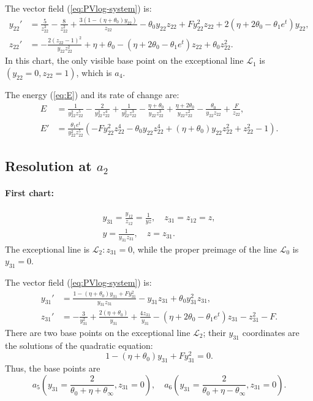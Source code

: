 The vector field (\ref{eq:PVlog-system}) is:
$$
\begin{aligned}
y_{22}'&=
\frac{5}{z_{22}^3} - \frac{8}{z_{22}^2} + \frac{3(1-( \eta+\theta_0) y_{22})}{z_{22}} 
- \theta_0 y_{22} z_{22} + F y_{22}^2 z_{22}+2 (\eta +2 \theta_0-\theta_1 e^t) y_{22} 
,
\\
z_{22}'&=
-\frac{2 ( z_{22}-1)^2}{y_{22} z_{22}^2}+
\eta + \theta_0  - (\eta+ 2 \theta_0-\theta_1 e^t) z_{22} + \theta_0 z_{22}^2
.
\end{aligned}
$$
In this chart, the only visible base point on the exceptional line $\mathcal{L}_1$ is $(y_{22}=0,z_{22}=1)$, which is $a_4$.

The energy (\ref{eq:E}) and its rate of change are:
$$
\begin{aligned}
E&=
\frac{1}{y_{22}^2 z_{22}^5}-\frac{2}{y_{22}^2 z_{22}^4}+\frac{1}{y_{22}^2 z_{22}^3}
-\frac{\eta+\theta_0}{y_{22} z_{22}^3}+\frac{\eta+2 \theta_0}{y_{22} z_{22}^2}-\frac{\theta_0}{y_{22} z_{22}}+\frac{F}{z_{22}}
,
\\
E'&=
\frac{\theta_1 e^t}{y_{22}^2 z_{22}^5}
\left(
-F y_{22}^2 z_{22}^4-\theta_0 y_{22} z_{22}^4+(\eta +\theta_0) y_{22} z_{22}^2+z_{22}^2-1
\right)
. 
\end{aligned}
$$


\subsection{Resolution at $a_2$}\label{a2-blow}
\paragraph{First chart:}
\begin{gather*}
y_{31}=\frac{y_{12}}{z_{12}}=\frac{1}{yz},
\quad
z_{31}=z_{12}=z,
\\
y=\frac{1}{y_{31}z_{31}},
\quad
z=z_{31}.
\end{gather*}
The exceptional line is $\mathcal{L}_2 : z_{31}=0$, while the proper preimage of the line $\mathcal{L}_{0}$ is $y_{31}=0$. 

The vector field (\ref{eq:PVlog-system}) is:
$$
\begin{aligned}
y_{31}'&=\frac{1 - (\eta + \theta_0) y_{31} + F y_{31}^2}{y_{31} z_{31}}-y_{31} z_{31} + \theta_0 y_{31}^2 z_{31}
,
\\
z_{31}'&=
- \frac{3}{y_{31}^2} + \frac{2( \eta+ \theta_0)}{y_{31}}+ \frac{ 4 z_{31}}{y_{31}} - (\eta + 2 \theta_0-\theta_1 e^t) z_{31}  - z_{31}^2-F 
.
\end{aligned}
$$
There are two base points on the exceptional line $\mathcal{L}_2$; their $y_{31}$ coordinates are the solutions of the quadratic equation:
$$
1 - (\eta + \theta_0) y_{31} + F y_{31}^2=0.
$$
Thus, the base points are
$$
a_5\left(y_{31}=\frac{2}{\theta_0+\eta+\theta_{\infty}},z_{31}=0\right),
\quad
a_6\left(y_{31}=\frac{2}{\theta_0+\eta-\theta_{\infty}},z_{31}=0\right).
$$


